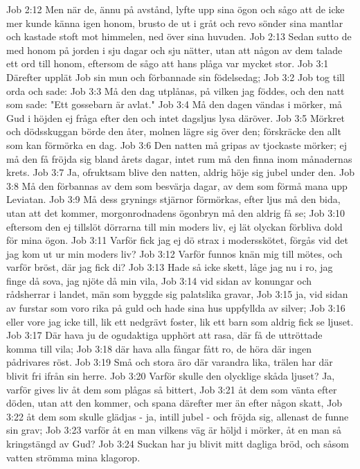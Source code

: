 Job 2:12  Men när de, ännu på avstånd, lyfte upp sina ögon och sågo att de icke mer kunde känna igen honom, brusto de ut i gråt och revo sönder sina mantlar och kastade stoft mot himmelen, ned över sina huvuden.
Job 2:13  Sedan sutto de med honom på jorden i sju dagar och sju nätter, utan att någon av dem talade ett ord till honom, eftersom de sågo att hans plåga var mycket stor.
Job 3:1  Därefter upplät Job sin mun och förbannade sin födelsedag;
Job 3:2  Job tog till orda och sade:
Job 3:3  Må den dag utplånas, på vilken jag föddes, och den natt som sade: "Ett gossebarn är avlat."
Job 3:4  Må den dagen vändas i mörker, må Gud i höjden ej fråga efter den och intet dagsljus lysa däröver.
Job 3:5  Mörkret och dödsskuggan börde den åter, molnen lägre sig över den; förskräcke den allt som kan förmörka en dag.
Job 3:6  Den natten må gripas av tjockaste mörker; ej må den få fröjda sig bland årets dagar, intet rum må den finna inom månadernas krets.
Job 3:7  Ja, ofruktsam blive den natten, aldrig höje sig jubel under den.
Job 3:8  Må den förbannas av dem som besvärja dagar, av dem som förmå mana upp Leviatan.
Job 3:9  Må dess grynings stjärnor förmörkas, efter ljus må den bida, utan att det kommer, morgonrodnadens ögonbryn må den aldrig få se;
Job 3:10  eftersom den ej tillslöt dörrarna till min moders liv, ej lät olyckan förbliva dold för mina ögon.
Job 3:11  Varför fick jag ej dö strax i modersskötet, förgås vid det jag kom ut ur min moders liv?
Job 3:12  Varför funnos knän mig till mötes, och varför bröst, där jag fick di?
Job 3:13  Hade så icke skett, låge jag nu i ro, jag finge då sova, jag njöte då min vila,
Job 3:14  vid sidan av konungar och rådsherrar i landet, män som byggde sig palatslika gravar,
Job 3:15  ja, vid sidan av furstar som voro rika på guld och hade sina hus uppfyllda av silver;
Job 3:16  eller vore jag icke till, lik ett nedgrävt foster, lik ett barn som aldrig fick se ljuset.
Job 3:17  Där hava ju de ogudaktiga upphört att rasa, där få de uttröttade komma till vila;
Job 3:18  där hava alla fångar fått ro, de höra där ingen pådrivares röst.
Job 3:19  Små och stora äro där varandra lika, trälen har där blivit fri ifrån sin herre.
Job 3:20  Varför skulle den olycklige skåda ljuset? Ja, varför gives liv åt dem som plågas så bittert,
Job 3:21  åt dem som vänta efter döden, utan att den kommer, och spana därefter mer än efter någon skatt,
Job 3:22  åt dem som skulle glädjas - ja, intill jubel - och fröjda sig, allenast de funne sin grav;
Job 3:23  varför åt en man vilkens väg är höljd i mörker, åt en man så kringstängd av Gud?
Job 3:24  Suckan har ju blivit mitt dagliga bröd, och såsom vatten strömma mina klagorop.
